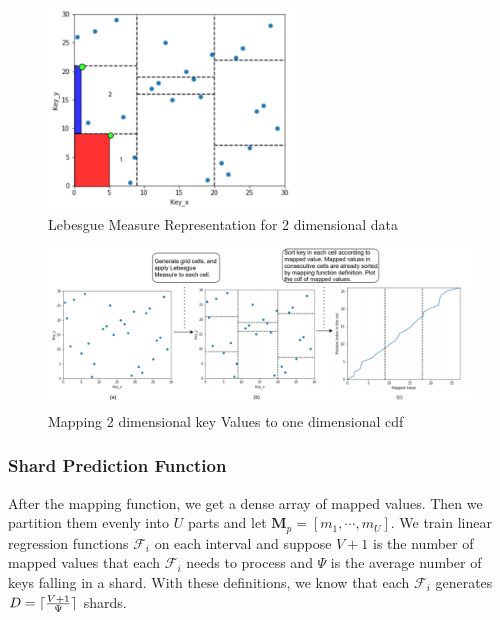 \begin{figure}[t]
    \centering
    \includegraphics[width=0.6\textwidth]{graphs/Lebesgue_Measure.png}
    \caption{Lebesgue Measure Representation for 2 dimensional data }
    \label{fig:Lebesgue_Measure}
\end{figure}




\begin{figure}[t]
    \centering
    \includegraphics[width=1\textwidth]{graphs/Mapped_Cdf.png}
    \caption{Mapping 2 dimensional key Values to one dimensional cdf }
    \label{fig:Mapped_Cdf}
\end{figure}

\subsubsection{Shard Prediction Function}

After the mapping function, we get a dense array of mapped values. Then we partition them evenly into $U$ parts and let $\boldsymbol{M}_p=[m_1,\cdots, m_U]$. We train linear regression functions $\mathcal{F}_i$ on each interval and suppose $V+1$ is the number of mapped values that each $\mathcal{F}_i$ needs to process and $\Psi$ is the average number of keys falling in a shard. With these definitions, we know that each $\mathcal{F}_i$ generates $D=\lceil\frac{V+1}{\Psi}\rceil$ shards.

